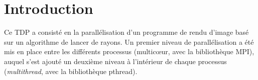\section*{Introduction}

Ce TDP a consisté en la parallélisation d'un programme de rendu d'image basé sur un algorithme de lancer de rayons. Un premier niveau de parallélisation a été mis en place entre les différents processus (multic\oe ur, avec la bibliothèque \textsf{MPI}), auquel s'est ajouté un deuxième niveau à l'intérieur de chaque processus (\emph{multithread}, avec la bibliothèque \textsf{pthread}).
